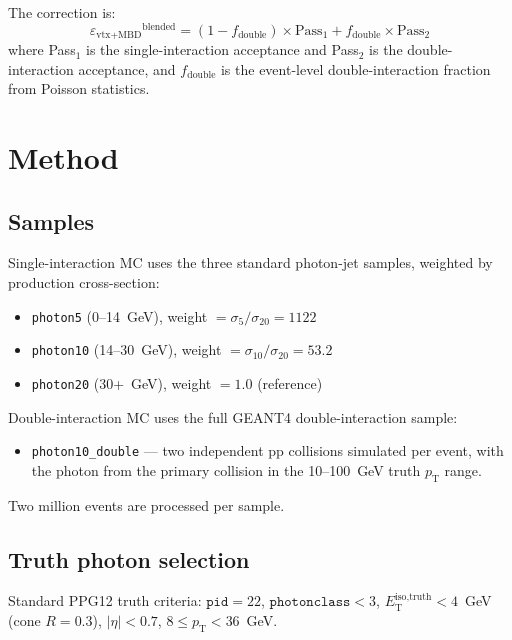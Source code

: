 \documentclass[11pt,letterpaper]{article}
\newcommand{\pT}{\ensuremath{p_{\text{T}}}}
\newcommand{\abseta}{\ensuremath{|\eta|}}
\newcommand{\vtxeff}{\ensuremath{\varepsilon_{\text{vtx+MBD}}}}
\newcommand{\fdouble}{\ensuremath{f_{\text{double}}}}
\begin{document}
The correction is:
\begin{equation}
  \vtxeff^{\text{blended}} = (1 - \fdouble) \times \text{Pass}_1
    + \fdouble \times \text{Pass}_2
  \label{eq:blend}
\end{equation}
where Pass$_1$ is the single-interaction acceptance and Pass$_2$ is
the double-interaction acceptance, and $\fdouble$ is the event-level
double-interaction fraction from Poisson statistics.

\section{Method}
\label{sec:method}

\subsection{Samples}
\label{sec:samples}

Single-interaction MC uses the three standard photon-jet samples,
weighted by production cross-section:
\begin{itemize}
  \item \texttt{photon5} (0--14~GeV), weight $= \sigma_5 / \sigma_{20} = 1122$
  \item \texttt{photon10} (14--30~GeV), weight $= \sigma_{10} / \sigma_{20} = 53.2$
  \item \texttt{photon20} (30+~GeV), weight $= 1.0$ (reference)
\end{itemize}

Double-interaction MC uses the full GEANT4 double-interaction sample:
\begin{itemize}
  \item \texttt{photon10\_double} --- two independent pp collisions
    simulated per event, with the photon from the primary collision
    in the 10--100~GeV truth $\pT$ range.
\end{itemize}

Two million events are processed per sample.

\subsection{Truth photon selection}
\label{sec:selection}

Standard PPG12 truth criteria:
$\texttt{pid} = 22$, $\texttt{photonclass} < 3$,
$E_\text{T}^\text{iso,truth} < 4$~GeV (cone $R = 0.3$),
$\abseta < 0.7$, $8 \leq \pT < 36$~GeV.
\end{document}
